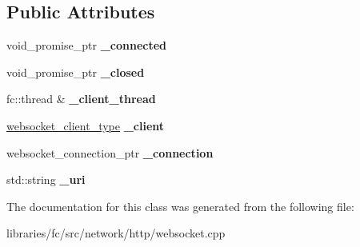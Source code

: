 \subsection*{Public Attributes}
\begin{DoxyCompactItemize}
\item 
\mbox{\label{classfc_1_1http_1_1detail_1_1websocket__client__impl_af620ec804a31dd9bd20e1648236c45a2}} 
void\+\_\+promise\+\_\+ptr {\bfseries \+\_\+connected}
\item 
\mbox{\label{classfc_1_1http_1_1detail_1_1websocket__client__impl_a8e4f434b4a93e0019d392a108a9384b6}} 
void\+\_\+promise\+\_\+ptr {\bfseries \+\_\+closed}
\item 
\mbox{\label{classfc_1_1http_1_1detail_1_1websocket__client__impl_ad6baa6969ca5275b542b4f8168836f3a}} 
fc\+::thread \& {\bfseries \+\_\+client\+\_\+thread}
\item 
\mbox{\label{classfc_1_1http_1_1detail_1_1websocket__client__impl_a473821caae5a3290032ee62c331928aa}} 
\mbox{\hyperlink{classwebsocketpp_1_1client}{websocket\+\_\+client\+\_\+type}} {\bfseries \+\_\+client}
\item 
\mbox{\label{classfc_1_1http_1_1detail_1_1websocket__client__impl_a6de426d151b30bcacb3b4084149c6b27}} 
websocket\+\_\+connection\+\_\+ptr {\bfseries \+\_\+connection}
\item 
\mbox{\label{classfc_1_1http_1_1detail_1_1websocket__client__impl_a8f18827b427d1734d56d07ace8feba71}} 
std\+::string {\bfseries \+\_\+uri}
\end{DoxyCompactItemize}


The documentation for this class was generated from the following file\+:\begin{DoxyCompactItemize}
\item 
libraries/fc/src/network/http/websocket.\+cpp\end{DoxyCompactItemize}
